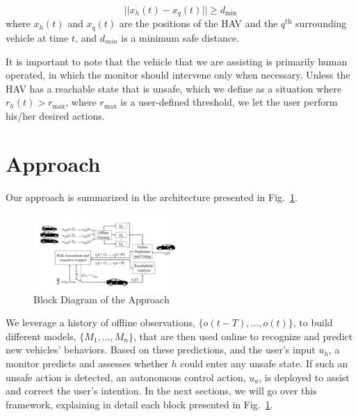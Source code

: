 \documentclass[letterpaper, 10 pt, conference]{ieeeconf}  %
\begin{document}
    \begin{equation}
        ||{x_h(t)-x_q(t)}|| \geq d_{\textrm{min}}
    \end{equation}
     where $x_h(t)$ and $x_q(t)$ are the positions of the HAV and the $q^{\textrm{th}}$ surrounding vehicle at time $t$, and $d_{min}$ is a minimum safe distance.    
    
    It is important to note that the vehicle that we are assisting is primarily human operated, in which the monitor should intervene only when necessary.
    Unless the HAV has a reachable state that is unsafe, which we define as a situation where $r_h(t)>r_{\max}$, where $r_{\max}$ is a user-defined threshold, we let the user perform his/her desired actions.


\section{Approach} \label{sec:approach}

Our approach is summarized in the architecture presented in Fig.~\ref{fig:app}. 
\begin{figure}[ht!]
    \includegraphics[width=0.48\textwidth]{fig/approach.png}
    \caption{Block Diagram of the Approach}
    \label{fig:app}
\end{figure}

We leverage a history of offline observations, $\{o(t-T),\ldots,o(t)\}$, to build different models, $\{M_1,\ldots,M_n\}$, that are then used online to recognize and predict new vehicles' behaviors. Based on these predictions, and the user's input $u_h$, a monitor predicts and assesses whether $h$ could enter any unsafe state. If such an unsafe action is detected, an autonomous control action, $u_a$, is deployed to assist and correct the user's intention. In the next sections, we will go over this framework, explaining in detail each block presented in Fig.~\ref{fig:app}.
\end{document}

